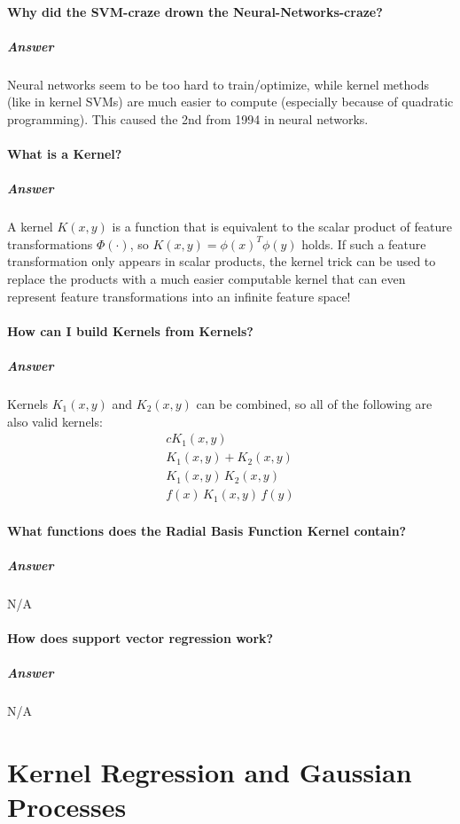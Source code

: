 \documentclass[a4paper, 11pt, accentcolor = tud3b]{tudreport}
\newcommand{\answer}[1]{\subparagraph{Answer} #1}
\begin{document}
			\paragraph{Why did the SVM-craze drown the Neural-Networks-craze?} %
			\answer{Neural networks seem to be too hard to train/optimize, while kernel methods (like in kernel SVMs) are much easier to compute (especially because of quadratic programming). This caused the 2nd from 1994 in neural networks.}

			\paragraph{What is a Kernel?}
			\answer{A kernel \( K(x, y) \) is a function that is equivalent to the scalar product of feature transformations \( \Phi(\cdot) \), so \( K(x, y) = \phi(x)^T \phi(y) \) holds. If such a feature transformation only appears in scalar products, the kernel trick can be used to replace the products with a much easier computable kernel that can even represent feature transformations into an infinite feature space!}

			\paragraph{How can I build Kernels from Kernels?}
			\answer{
				Kernels \( K_1(x, y) \) and \( K_2(x, y) \) can be combined, so all of the following are also valid kernels:
				\begin{gather*}
					c K_1(x, y) \\
					K_1(x, y) + K_2(x, y) \\
					K_1(x, y) \, K_2(x, y) \\
					f(x) \, K_1(x, y) \, f(y)
				\end{gather*}
			}

			\paragraph{What functions does the Radial Basis Function Kernel contain?}
			\answer{N/A} %

			\paragraph{How does support vector regression work?}
			\answer{N/A} %

		\section{Kernel Regression and Gaussian Processes}
\end{document}

